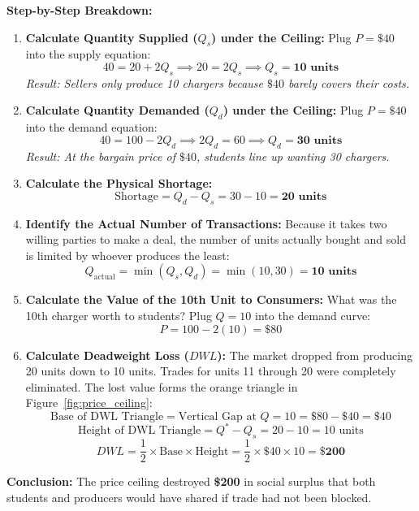 \documentclass[11pt,letterpaper]{article}
\begin{document}
\noindent\textbf{Step-by-Step Breakdown:}
\begin{enumerate}
    \item \textbf{Calculate Quantity Supplied ($Q_s$) under the Ceiling:}
    Plug $P = \$40$ into the supply equation:
    \[
    40 = 20 + 2Q_s \implies 20 = 2Q_s \implies Q_s = \mathbf{10\text{ units}}
    \]
    \emph{Result: Sellers only produce 10 chargers because $\$40$ barely covers their costs.}
    
    \item \textbf{Calculate Quantity Demanded ($Q_d$) under the Ceiling:}
    Plug $P = \$40$ into the demand equation:
    \[
    40 = 100 - 2Q_d \implies 2Q_d = 60 \implies Q_d = \mathbf{30\text{ units}}
    \]
    \emph{Result: At the bargain price of $\$40$, students line up wanting 30 chargers.}
    
    \item \textbf{Calculate the Physical Shortage:}
    \[
    \text{Shortage} = Q_d - Q_s = 30 - 10 = \mathbf{20\text{ units}}
    \]
    
    \item \textbf{Identify the Actual Number of Transactions:}
    Because it takes two willing parties to make a deal, the number of units actually bought and sold is limited by whoever produces the least:
    \[
    Q_{\text{actual}} = \min(Q_s, Q_d) = \min(10, 30) = \mathbf{10\text{ units}}
    \]
    
    \item \textbf{Calculate the Value of the 10th Unit to Consumers:}
    What was the 10th charger worth to students? Plug $Q = 10$ into the demand curve:
    \[
    P = 100 - 2(10) = \$80
    \]
    
    \item \textbf{Calculate Deadweight Loss ($DWL$):}
    The market dropped from producing 20 units down to 10 units. Trades for units 11 through 20 were completely eliminated. The lost value forms the orange triangle in Figure~\ref{fig:price_ceiling}:
    \[
    \text{Base of DWL Triangle} = \text{Vertical Gap at } Q=10 = \$80 - \$40 = \$40
    \]
    \[
    \text{Height of DWL Triangle} = Q^* - Q_s = 20 - 10 = 10\text{ units}
    \]
    \[
    DWL = \frac{1}{2} \times \text{Base} \times \text{Height} = \frac{1}{2} \times \$40 \times 10 = \mathbf{\$200}
    \]
\end{enumerate}
\textbf{Conclusion:} The price ceiling destroyed \textbf{\$200} in social surplus that both students and producers would have shared if trade had not been blocked.
\end{document}
